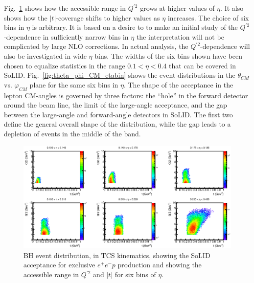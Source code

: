 Fig.~\ref{fig:t_Q2_etabin} shows how the accessible range in $Q^{\prime 2}$
grows at higher values of $\eta$. It also shows how the $|t|$-coverage
shifts to higher values as $\eta$ increases.
The choice of six bins in $\eta$ is arbitrary. It is based on a desire to
to make an initial study of the $Q^{\prime 2}$-dependence in sufficiently
narrow bins in $\eta$ the interpretation will not be complicated by 
large NLO corrections. In actual  analysis, the $Q^{\prime 2}$-dependence
will also be investigated in wide $\eta$ bins. The widths of the six bins
shown have been chosen to equalize statistics in the range $0.1<\eta<0.4$
that can be covered in SoLID.
Fig.~\ref{fig:theta_phi_CM_etabin} shows the event distributions in the
$\theta_{CM}$ vs. $\varphi_{CM}$ plane for the same six bins in $\eta$.
The shape of the acceptance in the lepton CM-angles is governed by three
factors: the ``hole'' in the forward detector around the beam line, the
limit of the large-angle acceptance, and the gap between the large-angle
and forward-angle detectors in SoLID. 
The first two define the general overall shape of the distribution, while
the gap leads to a depletion of events in the middle of the band.

\begin{figure}[t]
\includegraphics[scale=0.8]{t_Q2_etabin.eps}
\caption{\small{BH event distribution, in TCS kinematics, showing the SoLID
acceptance for exclusive $e^+e^-p$ production and showing the accessible
range in $Q^{\prime 2}$ and $|t|$ for six bins of $\eta$.}}
\label{fig:t_Q2_etabin}
\end{figure}

